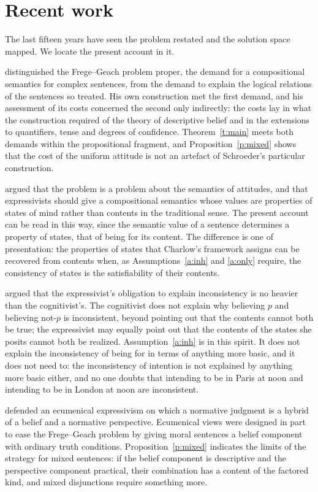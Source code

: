 \documentclass{situationist-preprint}
\begin{document}
\section{Recent work}\label{s:recent}

The last fifteen years have seen the problem restated and the solution space mapped. We locate the present account in it.

\citet{Schroeder2008compass} distinguished the Frege--Geach problem proper, the demand for a compositional semantics for complex sentences, from the demand to explain the logical relations of the sentences so treated. His own construction met the first demand, and his assessment of its costs concerned the second only indirectly: the costs lay in what the construction required of the theory of descriptive belief and in the extensions to quantifiers, tense and degrees of confidence. Theorem~\ref{t:main} meets both demands within the propositional fragment, and Proposition~\ref{p:mixed} shows that the cost of the uniform attitude is not an artefact of Schroeder's particular construction.

\citet{Charlow2014} argued that the problem is a problem about the semantics of attitudes, and that expressivists should give a compositional semantics whose values are properties of states of mind rather than contents in the traditional sense. The present account can be read in this way, since the semantic value of a sentence determines a property of states, that of being for its content. The difference is one of presentation: the properties of states that Charlow's framework assigns can be recovered from contents when, as Assumptions~\ref{a:inh} and \ref{a:only} require, the consistency of states is the satisfiability of their contents.

\citet{BakerWoods2015} argued that the expressivist's obligation to explain inconsistency is no heavier than the cognitivist's. The cognitivist does not explain why believing $p$ and believing not-$p$ is inconsistent, beyond pointing out that the contents cannot both be true; the expressivist may equally point out that the contents of the states she posits cannot both be realized. Assumption~\ref{a:inh} is in this spirit. It does not explain the inconsistency of being for in terms of anything more basic, and it does not need to: the inconsistency of intention is not explained by anything more basic either, and no one doubts that intending to be in Paris at noon and intending to be in London at noon are inconsistent.

\citet{Ridge2014} defended an ecumenical expressivism on which a normative judgment is a hybrid of a belief and a normative perspective. Ecumenical views were designed in part to ease the Frege--Geach problem by giving moral sentences a belief component with ordinary truth conditions. Proposition~\ref{p:mixed} indicates the limits of the strategy for mixed sentences: if the belief component is descriptive and the perspective component practical, their combination has a content of the factored kind, and mixed disjunctions require something more.
\end{document}
